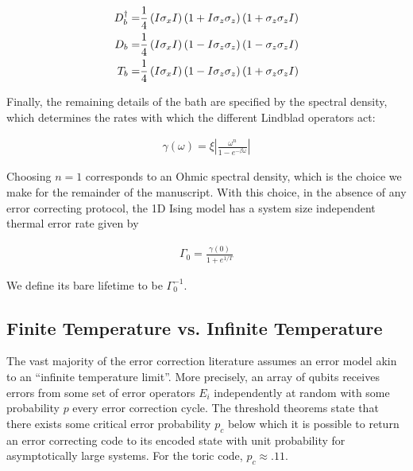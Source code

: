 \documentclass[twocolumn,superscriptaddress,aps,prb,floatfix]{revtex4-1}
\begin{document}
\begin{align}
D^\dagger_{b}= &\frac{1}{4} \left(I \sigma_x I \right)\left(1+I \sigma_z \sigma_z\right)\left(1+ \sigma_z \sigma_z I\right) \notag \\
D_{b}= &\frac{1}{4} \left(I \sigma_x I \right)\left(1-I \sigma_z \sigma_z\right)\left(1-\sigma_z \sigma_z I\right) \notag \\
T_{b}= &\frac{1}{4} \left(I \sigma_x I \right)\left(1-I \sigma_z \sigma_z\right)\left(1+ \sigma_z \sigma_z I\right) \label{eq:LindbladDef}
\end{align}

Finally, the remaining details of the bath are specified by the spectral density, which determines the rates with which the different Lindblad operators act:

\begin{align}
\gamma \left( \omega \right)=\xi \left  \vert \frac{\omega^n }{1-e^{-\beta \omega }} \right \vert \label{eq:gammadef}
\end{align}

Choosing $n=1$ corresponds to an Ohmic spectral density, which is the choice we make for the remainder of the manuscript.  With this choice, in the absence of any error correcting protocol, the 1D Ising model has a system size independent thermal error rate given by\cite{Freeman2016}

\begin{align}
\Gamma_0 = \frac{\gamma(0)}{1+e^{1/T}} 
\end{align}

We define its bare lifetime to be $\Gamma_0^{-1}$.

\subsection{Finite Temperature vs. Infinite Temperature}
\label{sec:temperature}

 The vast majority of the error correction literature assumes an error model akin to an ``infinite temperature limit''.  More precisely, an array of qubits receives errors from some set of error operators ${E_i}$ independently at random with some probability $p$ every error correction cycle.  The threshold theorems state that there exists some critical error probability $p_c$ below which it is possible to return an error correcting code to its encoded state with unit probability for asymptotically large systems.  For the toric code, $p_c\approx.11$.
 
\end{document}
